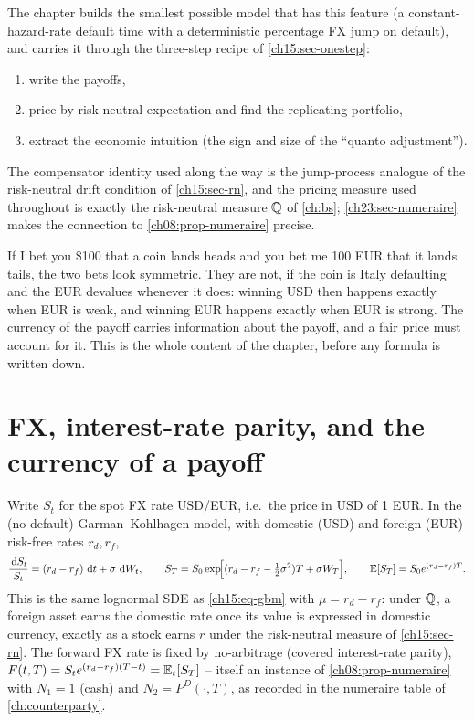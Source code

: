 \begin{paracol}{2}
The chapter builds the smallest possible model that has this feature (a constant-hazard-rate default time with a
deterministic percentage FX jump on default), and carries it through the three-step recipe of
\cref{ch15:sec-onestep}:
\begin{enumerate}[1.]
  \item write the payoffs,
  \item price by risk-neutral expectation and find the replicating
      portfolio,
  \item extract the economic intuition (the sign and size of the ``quanto adjustment'').
\end{enumerate}
The compensator identity used along the way is the jump-process analogue of the risk-neutral drift condition of
\cref{ch15:sec-rn}, and the pricing measure used throughout is exactly the risk-neutral measure $\mathbb{Q}$ of
\cref{ch:bs}; \cref{ch23:sec-numeraire} makes the connection to \cref{ch08:prop-numeraire} precise.

\begin{intuition}
If I bet you \$100 that a coin lands heads and you bet me 100 EUR that it lands tails, the two bets look
symmetric. They are not, if the coin is Italy defaulting and the EUR devalues whenever it does: winning USD then
happens exactly when EUR is weak, and winning EUR happens exactly when EUR is strong. The currency of the payoff
carries information about the payoff, and a fair price must account for it. This is the whole content of the
chapter, before any formula is written down.
\end{intuition}

\section{FX, interest-rate parity, and the currency of a payoff}\label{ch23:sec-fx}
Write $S_t$ for the spot FX rate USD/EUR, i.e.\ the price in USD of 1 EUR. In the (no-default) Garman--Kohlhagen
model, with domestic (USD) and foreign (EUR) risk-free rates $r_d,r_f$,
\begin{equation}\label{ch23:eq-gk}
  \frac{\,\mathrm{d} S_t}{S_t}=(r_d-r_f)\,\,\mathrm{d} t+\sigma\,\,\mathrm{d} W_t ,\qquad
  S_T=S_0\exp\!\Bigl[(r_d-r_f-\tfrac12\sigma^2)T+\sigma W_T\Bigr],\qquad
  \mathbb{E}[S_T]=S_0e^{(r_d-r_f)T}.
\end{equation}
This is the same lognormal SDE as \cref{ch15:eq-gbm} with $\mu=r_d-r_f$: under $\mathbb{Q}$, a foreign asset earns the
domestic rate once its value is expressed in domestic currency, exactly as a stock earns $r$ under the
risk-neutral measure of \cref{ch15:sec-rn}. The forward FX rate is fixed by no-arbitrage (covered interest-rate
parity), $F(t,T)=S_te^{(r_d-r_f)(T-t)}=\mathbb{E}_t[S_T]$ -- itself an instance of \cref{ch08:prop-numeraire} with
$N_1=1$ (cash) and $N_2=P^D(\cdot,T)$, as recorded in the numeraire table of \cref{ch:counterparty}.


\end{paracol}

